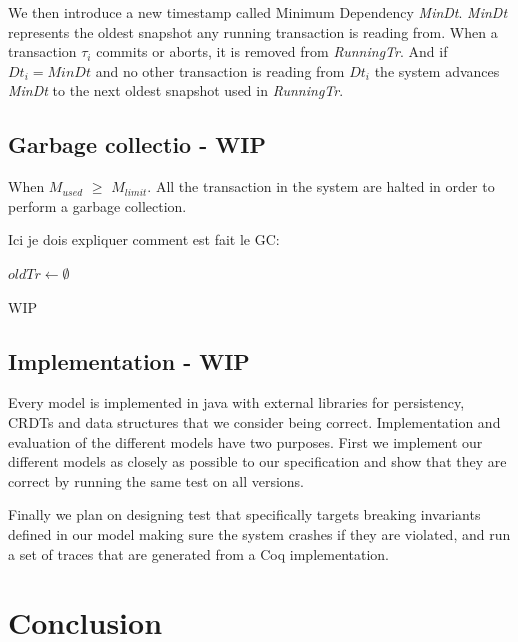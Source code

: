 \documentclass[systeme,french,english]{compas2022}
\begin{document}
We then introduce a new timestamp called Minimum Dependency \emph{MinDt}.
\emph{MinDt} represents the oldest snapshot any running transaction is reading from.
When a transaction $\tau_i$ commits or aborts, it is removed from \emph{RunningTr}. 
And if $Dt_i = MinDt$ and no other transaction is reading from $Dt_i$ the system advances \emph{MinDt} to the next oldest snapshot used in \emph{RunningTr}.

\subsection{Garbage collectio - WIP}
When \emph{$M_{used}$} $\geq$ \emph{$M_{limit}$}. 
All the transaction in the system are halted in order to perform a garbage collection.

Ici je dois expliquer comment est fait le GC:\\
\begin{algorithm}
  \(oldTr \longleftarrow \emptyset\)\;
\end{algorithm}

WIP


\subsection{Implementation - WIP}

Every model is implemented in java with external libraries for persistency, CRDTs and data structures that we consider being correct.
Implementation and evaluation of the different models have two purposes.
First we implement our different models as closely as possible to our specification and show that they are correct by running the same test on all versions.

Finally we plan on designing test that specifically targets breaking invariants defined in our model making sure the system crashes if they are violated, and run a set of traces that are generated from a Coq implementation.



\section{Conclusion}



\end{document}

